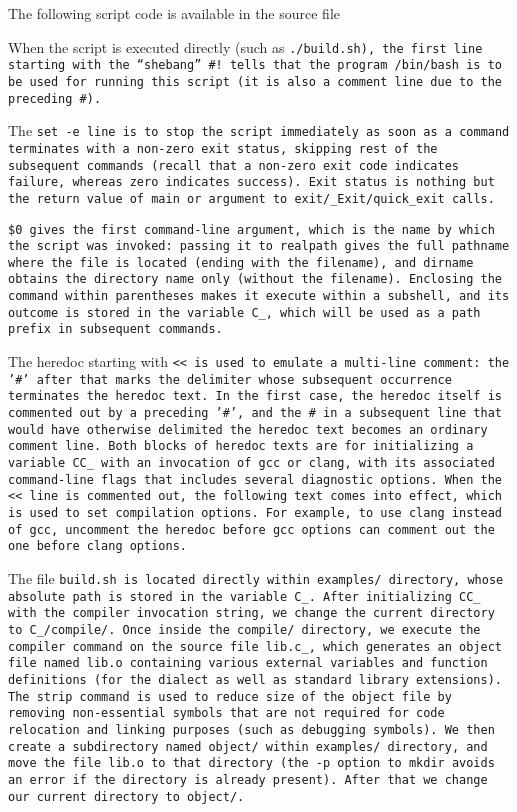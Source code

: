 \enlargethispage*{\baselineskip}
\enlargethispage*{\baselineskip}

The following script code is available in the source file 

When the script is executed directly (such as \tt{./build.sh}),
the first line starting with the ``shebang'' \tt{#!} tells that
the program \tt{/bin/bash} is to be used for running this script
(it is also a comment line due to the preceding \tt{#}).

The \tt{set -e} line is to stop the script immediately as soon as a command
terminates with a non-zero exit status, skipping rest of the subsequent commands
(recall that a non-zero exit code indicates failure, whereas zero indicates success).
Exit status is nothing but the return value of \tt{main}
or argument to \tt{exit}/\tt{_Exit}/\tt{quick_exit} calls.

\tt{\$0} gives the first command-line argument, which is the name by
which the script was invoked: passing it to \tt{realpath} gives the
full pathname where the file is located (ending with the filename),
and \tt{dirname} obtains the directory name only (without the filename).
Enclosing the command within parentheses makes it execute within
a subshell, and its outcome is stored in the variable \tt{C_},
which will be used as a path prefix in subsequent commands.

\pagebreak

The heredoc starting with \tt{<<} is used to emulate a multi-line comment:
the \tt{'#'} after that marks the delimiter whose
subsequent occurrence terminates the heredoc text.
In the first case, the heredoc itself is commented out by a preceding \tt{'#'},
and the \tt{#} in a subsequent line that would have otherwise
delimited the heredoc text becomes an ordinary comment line.
Both blocks of heredoc texts are for initializing a variable
\tt{CC_} with an invocation of \tt{gcc} or \tt{clang}, with its
associated command-line flags that includes several diagnostic options.
When the \tt{<<} line is commented out, the following text
comes into effect, which is used to set compilation options.
For example, to use \tt{clang} instead of \tt{gcc}, uncomment the heredoc
before \tt{gcc} options can comment out the one before \tt{clang} options.

The file \tt{build.sh} is located directly within \tt{examples/}
directory, whose absolute path is stored in the variable \tt{C_}.
After initializing \tt{CC_} with the compiler invocation string,
we change the current directory to \tt{C\_/compile/}.
Once inside the \tt{compile/} directory, we execute the compiler command
on the source file \tt{lib.c_}, which generates an object file named
\tt{lib.o} containing various external variables and function definitions
(for the dialect as well as standard library extensions).
The \tt{strip} command is used to reduce size of the object file
by removing non-essential symbols that are not required for code
relocation and linking purposes (such as debugging symbols).
We then create a subdirectory named \tt{object/} within \tt{examples/}
directory, and move the file \tt{lib.o} to that directory (the \tt{-p}
option to \tt{mkdir} avoids an error if the directory is already present).
After that we change our current directory to \tt{object/}.

